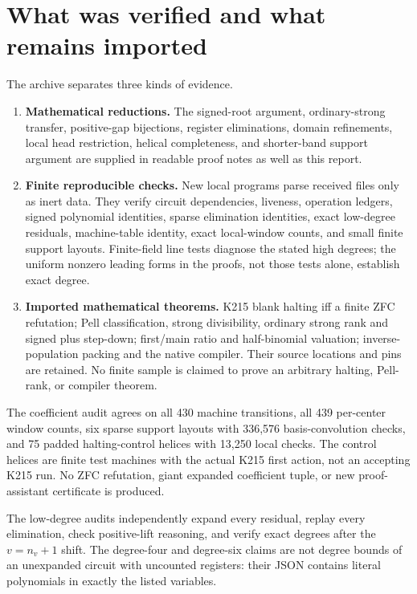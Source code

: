 \documentclass[11pt]{article}
\begin{document}
\section{What was verified and what remains imported}\label{sec:verification}

The archive separates three kinds of evidence.
\begin{enumerate}
\item \textbf{Mathematical reductions.} The signed-root argument, ordinary-strong transfer, positive-gap bijections, register eliminations, domain refinements, local head restriction, helical completeness, and shorter-band support argument are supplied in readable proof notes as well as this report.
\item \textbf{Finite reproducible checks.} New local programs parse received files only as inert data. They verify circuit dependencies, liveness, operation ledgers, signed polynomial identities, sparse elimination identities, exact low-degree residuals, machine-table identity, exact local-window counts, and small finite support layouts. Finite-field line tests diagnose the stated high degrees; the uniform nonzero leading forms in the proofs, not those tests alone, establish exact degree.
\item \textbf{Imported mathematical theorems.} K215 blank halting iff a finite ZFC refutation; Pell classification, strong divisibility, ordinary strong rank and signed plus step-down; first/main ratio and half-binomial valuation; inverse-population packing and the native compiler. Their source locations and pins are retained. No finite sample is claimed to prove an arbitrary halting, Pell-rank, or compiler theorem.
\end{enumerate}

The coefficient audit agrees on all 430 machine transitions, all 439 per-center window counts, six sparse support layouts with 336,576 basis-convolution checks, and 75 padded halting-control helices with 13,250 local checks. The control helices are finite test machines with the actual K215 first action, not an accepting K215 run. No ZFC refutation, giant expanded coefficient tuple, or new proof-assistant certificate is produced.

The low-degree audits independently expand every residual, replay every elimination, check positive-lift reasoning, and verify exact degrees after the $v=n_v+1$ shift. The degree-four and degree-six claims are not degree bounds of an unexpanded circuit with uncounted registers: their JSON contains literal polynomials in exactly the listed variables.
\end{document}
